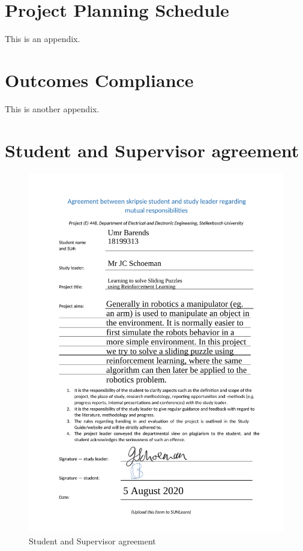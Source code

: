 

\chapter{Project Planning Schedule}
\makeatletter{}\makeatother
\label{appen:derivations_bigramseg}

This is an appendix.

\chapter{Outcomes Compliance}
\makeatletter{}\makeatother
\label{appen:derivations_bigramseg2}

This is another appendix.

\chapter{Student and Supervisor agreement}
\makeatletter{}\makeatother
\label{appen:Student_and_Supervisor_agreement}
\begin{figure}[!htb]
	\centering
	\includegraphics[width=0.75\linewidth]{appendices/fig/Umr_Barends_18199313_Student_and_Supervisor_agreement.pdf}
	\caption{Student and Supervisor agreement}
	\label{fig:agreement}
\end{figure}
